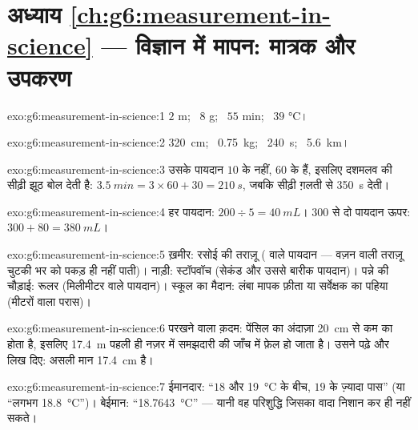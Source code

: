 \section*{अध्याय \ref{ch:g6:measurement-in-science} --- विज्ञान में मापन: मात्रक और उपकरण}

\begin{solution}{exo:g6:measurement-in-science:1}
$2$ \unit{m}; \ $8$ \unit{g}; \ $55$ \unit{min}; \ $39$
\unit{\celsius}।
\end{solution}

\begin{solution}{exo:g6:measurement-in-science:2}
\qty{320}{cm}; \ \qty{0.75}{kg}; \ \qty{240}{s}; \ \qty{5.6}{km}।
\end{solution}

\begin{solution}{exo:g6:measurement-in-science:3}
उसके पायदान $10$ के नहीं, $60$ के हैं, इसलिए दशमलव की सीढ़ी झूठ बोल
देती है: $\qty{3.5}{min} = 3 \times 60 + 30 = \qty{210}{s}$, जबकि
सीढ़ी ग़लती से \qty{350}{s} देती।
\end{solution}

\begin{solution}{exo:g6:measurement-in-science:4}
हर पायदान: $200 \div 5 = \qty{40}{mL}$। $300$ से दो पायदान ऊपर:
$300 + 80 = \qty{380}{mL}$।
\end{solution}

\begin{solution}{exo:g6:measurement-in-science:5}
ख़मीर: रसोई की तराज़ू ( वाले पायदान --- वज़न वाली तराज़ू चुटकी भर
को पकड़ ही नहीं पाती)। नाड़ी: स्टॉपवॉच (सेकंड और उससे बारीक पायदान)।
पन्ने की चौड़ाई: रूलर (मिलीमीटर वाले पायदान)। स्कूल का मैदान: लंबा
मापक फ़ीता या सर्वेक्षक का पहिया (मीटरों वाला परास)।
\end{solution}

\begin{solution}{exo:g6:measurement-in-science:6}
परखने वाला क़दम: पेंसिल का अंदाज़ा \qty{20}{cm} से कम का होता है,
इसलिए \qty{17.4}{m} पहली ही नज़र में समझदारी की जाँच में फ़ेल हो जाता
है। उसने  पढ़े और  लिख दिए: असली मान \qty{17.4}{cm} है।
\end{solution}

\begin{solution}{exo:g6:measurement-in-science:7}
ईमानदार: ``$18$ और \qty{19}{\celsius} के बीच, $19$ के ज़्यादा
पास'' (या ``लगभग \qty{18.8}{\celsius}'')। बेईमान:
``\qty{18.7643}{\celsius}'' --- यानी वह परिशुद्धि जिसका वादा निशान
कर ही नहीं सकते।
\end{solution}

